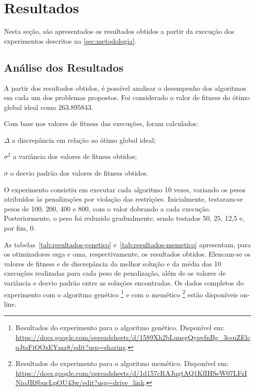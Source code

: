 \section{Resultados}%
\label{sec:resultados}

Nesta seção, são apresentados os resultados obtidos a partir da execução dos experimentos descritos na \autoref{sec:metodologia}.

\subsection{Análise dos Resultados}%

A partir dos resultados obtidos, é possível analisar o desempenho dos algoritmos em cada um dos problemas propostos.
Foi considerado o valor de \gls{fitness} do ótimo global ideal como 263.895843.

Com base nos valores de \gls{fitness} das execuções, foram calculados:

\begin{symbols}
    \item[\( \Delta \)] a discrepância em relação ao ótimo global ideal;
    \item[\( \sigma^{2} \)] a variância dos valores de \gls{fitness} obtidos;
    \item[\( \sigma \)] o desvio padrão dos valores de \gls{fitness} obtidos.
\end{symbols}

O experimento consistiu em executar cada algoritmo 10 vezes, variando os pesos atribuídos às penalizações por violação das restrições. Inicialmente, testaram-se pesos de 100, 200, 400 e 800, com o valor dobrando a cada execução. Posteriormente, o peso foi reduzido gradualmente, sendo testados 50, 25, 12,5 e, por fim, 0.

As tabelas~\ref{tab:resultados-genetico} e~\ref{tab:resultados-memetico} apresentam, para os otimizadores \gls{esga} e \gls{oma}, respectivamente, os resultados obtidos.
Elencam-se os valores de \gls{fitness} e de discrepância da melhor solução e da média das 10 execuções realizadas para cada peso de penalização, além de os valores de variância e desvio padrão entre as soluções encontradas.
Os dados completos do experimento com o algoritmo genético%
\footnote{%
    Resultados do experimento para o algoritmo genético. Disponível em: \url{https://docs.google.com/spreadsheets/d/1589Xh2bLunegQypvfnBg_3csuZElcqJtsFiOOzEYmz8/edit?usp=sharing}.
}
e com o memético%
\footnote{%
    Resultados do experimento para o algoritmo memético. Disponível em: \url{https://docs.google.com/spreadsheets/d/1d157cRAJqgtAQ1KfIHSeW07LFzINioJR8bucLpOU43w/edit?usp=drive_link}.
}
estão disponíveis on-line.

